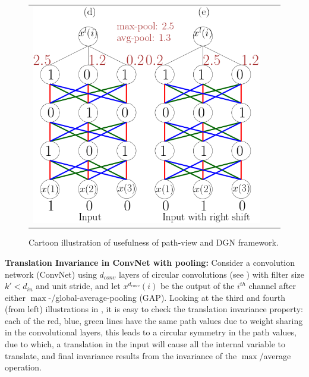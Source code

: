 \begin{figure}
{\begin{tabular}{ccc}
\includegraphics[scale=0.5]{figs/nnconv.png}
\end{tabular}
}
\caption{Cartoon illustration of usefulness of path-view and DGN framework.}
\label{fig:cartoon}
\end{figure}
\textbf{Translation Invariance in ConvNet with pooling:} Consider a convolution network (ConvNet) using $d_{conv}$ layers of circular convolutions (see ) with filter size $k'<d_{in}$ and unit stride, and let $x^{d_{conv}}(i)$ be the output of the $i^{th}$ channel after either $\max$-/global-average-pooling (GAP). Looking at the third and fourth (from left) illustrations in , it is easy to check the translation invariance property: each of the red, blue, green lines have the same path values due to weight sharing in the convolutional layers, this leads to a circular symmetry in the path values, due to which, a translation in the input will cause all the internal variable to translate, and final invariance results from the invariance of the $\max$/average operation.


